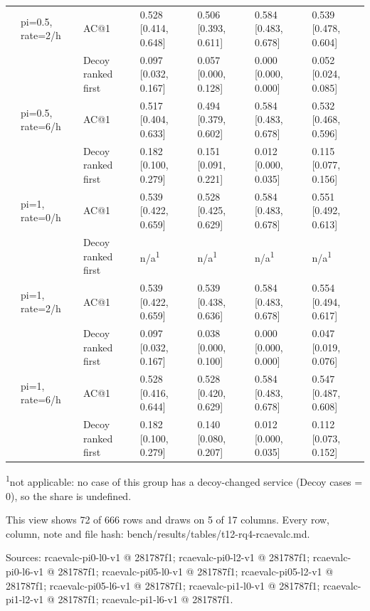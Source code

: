 \begin{table}[t]
\begin{tabular}{@{}lllllll@{}}
 & pi=0.5, rate=2/h & AC@1 & 0.528 [0.414, 0.648] & 0.506 [0.393, 0.611] & 0.584 [0.483, 0.678] & 0.539 [0.478, 0.604] \\
 &  & Decoy ranked first & 0.097 [0.032, 0.167] & 0.057 [0.000, 0.128] & 0.000 [0.000, 0.000] & 0.052 [0.024, 0.085] \\
 & pi=0.5, rate=6/h & AC@1 & 0.517 [0.404, 0.633] & 0.494 [0.379, 0.602] & 0.584 [0.483, 0.678] & 0.532 [0.468, 0.596] \\
 &  & Decoy ranked first & 0.182 [0.100, 0.279] & 0.151 [0.091, 0.221] & 0.012 [0.000, 0.035] & 0.115 [0.077, 0.156] \\
 & pi=1, rate=0/h & AC@1 & 0.539 [0.422, 0.659] & 0.528 [0.425, 0.629] & 0.584 [0.483, 0.678] & 0.551 [0.492, 0.613] \\
 &  & Decoy ranked first & n/a\textsuperscript{1} & n/a\textsuperscript{1} & n/a\textsuperscript{1} & n/a\textsuperscript{1} \\
 & pi=1, rate=2/h & AC@1 & 0.539 [0.422, 0.659] & 0.539 [0.438, 0.636] & 0.584 [0.483, 0.678] & 0.554 [0.494, 0.617] \\
 &  & Decoy ranked first & 0.097 [0.032, 0.167] & 0.038 [0.000, 0.100] & 0.000 [0.000, 0.000] & 0.047 [0.019, 0.076] \\
 & pi=1, rate=6/h & AC@1 & 0.528 [0.416, 0.644] & 0.528 [0.420, 0.629] & 0.584 [0.483, 0.678] & 0.547 [0.487, 0.608] \\
 &  & Decoy ranked first & 0.182 [0.100, 0.279] & 0.140 [0.080, 0.207] & 0.012 [0.000, 0.035] & 0.112 [0.073, 0.152] \\
\hline
\end{tabular}
\par\smallskip\scriptsize\raggedright
\textsuperscript{1}not applicable: no case of this group has a decoy-changed service (Decoy cases = 0), so the share is undefined.\par
This view shows 72 of 666 rows and draws on 5 of 17 columns. Every row, column, note and file hash: bench/\allowbreak{}results/\allowbreak{}tables/\allowbreak{}t12-rq4-rcaevalc.md.\par
Sources: rcaevalc-pi0-l0-v1 @ 281787f1; rcaevalc-pi0-l2-v1 @ 281787f1; rcaevalc-pi0-l6-v1 @ 281787f1; rcaevalc-pi05-l0-v1 @ 281787f1; rcaevalc-pi05-l2-v1 @ 281787f1; rcaevalc-pi05-l6-v1 @ 281787f1; rcaevalc-pi1-l0-v1 @ 281787f1; rcaevalc-pi1-l2-v1 @ 281787f1; rcaevalc-pi1-l6-v1 @ 281787f1.\par
\end{table}
